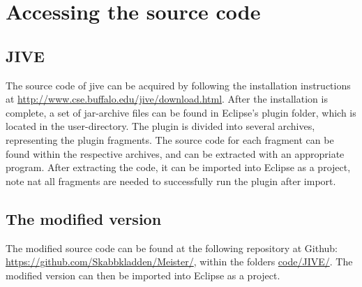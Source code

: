 \chapter{Accessing the source code}\label{appSrc}
\section{JIVE}\label{appSrcJive}
The source code of \gls{jive} can be acquired by following the installation instructions at \url{http://www.cse.buffalo.edu/jive/download.html}.
After the installation is complete, a set of jar-archive files can be found in Eclipse's plugin folder, which is located in the user-directory.
The plugin is divided into several archives, representing the plugin fragments.
The source code for each fragment can be found within the respective archives, and can be extracted with an appropriate program.
After extracting the code, it can be imported into Eclipse as a project, note nat all fragments are needed to successfully run the plugin after import.

\section{The modified version}\label{appSrcJiveMod}
The modified source code can be found at the following repository at Github: \url{https://github.com/Skabbkladden/Meister/}, within the folders \url{code/JIVE/}.
The modified version can then be imported into Eclipse as a project.